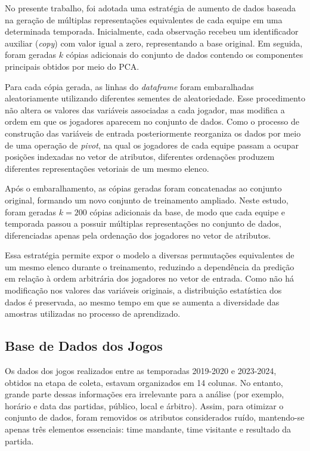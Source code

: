No presente trabalho, foi adotada uma estratégia de aumento de dados baseada na geração de múltiplas 
representações equivalentes de cada equipe em uma determinada temporada. Inicialmente, cada observação 
recebeu um identificador auxiliar (\textit{copy}) com valor igual a zero, representando a base original. 
Em seguida, foram geradas $k$ cópias adicionais do conjunto de dados contendo os componentes principais 
obtidos por meio do PCA.

Para cada cópia gerada, as linhas do \textit{dataframe} foram embaralhadas aleatoriamente utilizando 
diferentes sementes de aleatoriedade. Esse procedimento não altera os valores das variáveis associadas 
a cada jogador, mas modifica a ordem em que os jogadores aparecem no conjunto de dados. Como o processo 
de construção das variáveis de entrada posteriormente reorganiza os dados por meio de uma operação de 
\textit{pivot}, na qual os jogadores de cada equipe passam a ocupar posições indexadas no vetor de 
atributos, diferentes ordenações produzem diferentes representações vetoriais de um mesmo elenco.

Após o embaralhamento, as cópias geradas foram concatenadas ao conjunto original, formando um novo 
conjunto de treinamento ampliado. Neste estudo, foram geradas $k = 200$ cópias adicionais da base, de 
modo que cada equipe e temporada passou a possuir múltiplas representações no conjunto de dados, 
diferenciadas apenas pela ordenação dos jogadores no vetor de atributos.

Essa estratégia permite expor o modelo a diversas permutações equivalentes de um mesmo elenco durante o 
treinamento, reduzindo a dependência da predição em relação à ordem arbitrária dos jogadores no vetor de 
entrada. Como não há modificação nos valores das variáveis originais, a distribuição estatística dos dados 
é preservada, ao mesmo tempo em que se aumenta a diversidade das amostras utilizadas no processo de 
aprendizado.

\subsection{Base de Dados dos Jogos}

Os dados dos jogos realizados entre as temporadas 2019-2020 e 2023-2024, obtidos na etapa de coleta, estavam organizados em 14 colunas. No entanto, 
grande parte dessas informações era irrelevante para a análise (por exemplo, horário e data das partidas, público, local e árbitro). 
Assim, para otimizar o conjunto de dados, foram removidos os atributos considerados ruído, mantendo-se apenas três elementos essenciais: time mandante, 
time visitante e resultado da partida.

